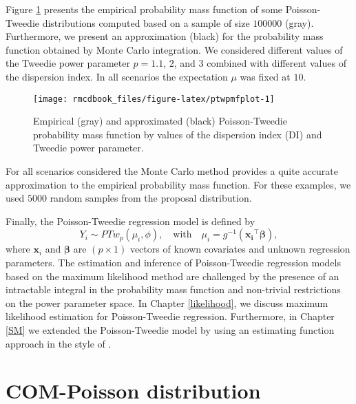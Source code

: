 \documentclass[9pt,a5paper,]{book}
\theoremstyle{definition}
\theoremstyle{definition}
\theoremstyle{remark}
\begin{document}
Figure \ref{fig:ptwpmfplot} presents the empirical probability mass
function of some Poisson-Tweedie distributions computed based on a
sample of size \(100000\) (gray). Furthermore, we present an
approximation (black) for the probability mass function obtained by
Monte Carlo integration. We considered different values of the Tweedie
power parameter \(p = 1.1\), \(2\), and \(3\) combined with different
values of the dispersion index. In all scenarios the expectation \(\mu\)
was fixed at \(10\).

\begin{figure}[h]

{\centering \texttt{[image: rmcdbook\_files/figure-latex/ptwpmfplot-1]} 

}

\caption{Empirical (gray) and approximated (black) Poisson-Tweedie probability mass function by values of the dispersion index (DI) and Tweedie power parameter.}\label{fig:ptwpmfplot}
\end{figure}

For all scenarios considered the Monte Carlo method provides a quite
accurate approximation to the empirical probability mass function. For
these examples, we used \(5000\) random samples from the proposal
distribution.

Finally, the Poisson-Tweedie regression model is defined by
\[Y_i \sim PTw_{p}(\mu_i, \phi), \quad  \text{with} \quad \mu_i = g^{-1}(\boldsymbol{x_i}^{\top} \boldsymbol{\beta}),\]
where \(\boldsymbol{x}_i\) and \(\boldsymbol{\beta}\) are
\((p \times 1)\) vectors of known covariates and unknown regression
parameters. The estimation and inference of Poisson-Tweedie regression
models based on the maximum likelihood method are challenged by the
presence of an intractable integral in the probability mass function and
non-trivial restrictions on the power parameter space. In Chapter
\ref{likelihood}, we discuss maximum likelihood estimation for
Poisson-Tweedie regression. Furthermore, in Chapter \ref{SM} we extended
the Poisson-Tweedie model by using an estimating function approach in
the style of \citet{Wedderburn1974}.

\section{COM-Poisson distribution}\label{com-poisson-distribution}
\end{document}
